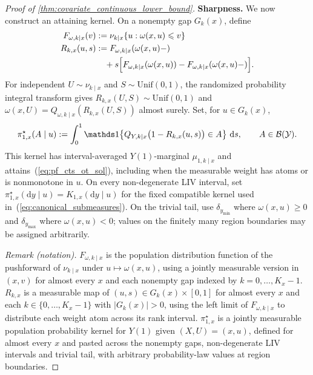 \begin{proof}[Proof of \cref{thm:covariate_continuous_lower_bound}]
\medskip
\noindent\textbf{Sharpness.}
We now construct an attaining kernel. On a nonempty gap $G_k(x)$, define
\begin{align*}
F_{\omega,k\mid x}(v) &:=\nu_{k\mid x}\{u:\omega(x,u)\leqslant v\} \\
R_{k,x}(u,s)
&:=F_{\omega,k\mid x}(\omega(x,u)-) \\
&\quad+s\Bigl[F_{\omega,k\mid x}(\omega(x,u))-F_{\omega,k\mid x}(\omega(x,u)-)\Bigr].
\end{align*}
For independent $U\sim\nu_{k\mid x}$ and $S\sim\mathrm{Unif}(0,1)$, the randomized probability integral transform gives $R_{k,x}(U,S)\sim\mathrm{Unif}(0,1)$ and $\omega(x,U)=Q_{\omega,k\mid x}(R_{k,x}(U,S))$ almost surely. Set, for $u\in G_k(x)$,
\begin{equation}\label{eq:pf_cts_rank_kernel}
\pi_{1,x}^\star(A\mid u)
:=\int_0^1\indicator\!\left\{Q_{Y,k\mid x}\bigl(1-R_{k,x}(u,s)\bigr)\in A\right\}\,\mathrm ds,
\qquad A\in\mathcal B(\mathcal Y).
\end{equation}
This kernel has interval-averaged $Y(1)$-marginal $\mu_{1,k\mid x}$ and attains~(\ref{eq:pf_cts_ot_sol}), including when the measurable weight has atoms or is nonmonotone in $u$. On every non-degenerate LIV interval, set $\pi_{1,x}^\star(\mathrm dy\mid u)=K_{1,x}(\mathrm dy\mid u)$ for the fixed compatible kernel used in~(\ref{eq:canonical_submeasures}). On the trivial tail, use $\delta_{y_{\min}}$ where $\omega(x,u)\geqslant0$ and $\delta_{y_{\max}}$ where $\omega(x,u)<0$; values on the finitely many region boundaries may be assigned arbitrarily.

\noindent\textit{Remark (notation).} $F_{\omega,k\mid x}$ is the population distribution function of the pushforward of $\nu_{k\mid x}$ under $u\mapsto\omega(x,u)$, using a jointly measurable version in $(x,v)$ for almost every $x$ and each nonempty gap indexed by $k=0,\ldots,K_x-1$. $R_{k,x}$ is a measurable map of $(u,s)\in G_k(x)\times[0,1]$ for almost every $x$ and each $k\in\{0,\ldots,K_x-1\}$ with $|G_k(x)|>0$, using the left limit of $F_{\omega,k\mid x}$ to distribute each weight atom across its rank interval. $\pi_{1,x}^\star$ is a jointly measurable population probability kernel for $Y(1)$ given $(X,U)=(x,u)$, defined for almost every $x$ and pasted across the nonempty gaps, non-degenerate LIV intervals and trivial tail, with arbitrary probability-law values at region boundaries.



\end{proof}

